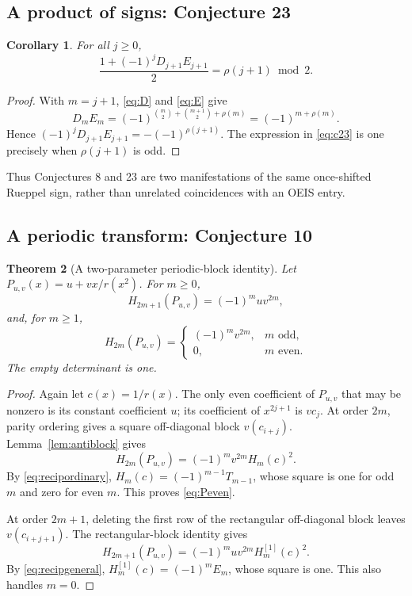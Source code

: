 \documentclass[11pt,a4paper]{article}
\numberwithin{equation}{section}
\newtheorem{theorem}{Theorem}[section]
\newtheorem{corollary}[theorem]{Corollary}
\theoremstyle{definition}
\theoremstyle{remark}
\newcommand{\Ones}{\rho}
\begin{document}
\subsection{A product of signs: Conjecture 23}

\begin{corollary}\label{cor:c23}
For all $j\ge0$,
\begin{equation}\label{eq:c23}
 \frac{1+(-1)^jD_{j+1}E_{j+1}}2
 =\Ones(j+1)\bmod2.
\end{equation}
\end{corollary}
\begin{proof}
With $m=j+1$, \eqref{eq:D} and \eqref{eq:E} give
\[
 D_mE_m=(-1)^{\binom m2+\binom{m+1}{2}+\Ones(m)}
       =(-1)^{m+\Ones(m)}.
\]
Hence $(-1)^jD_{j+1}E_{j+1}=-(-1)^{\Ones(j+1)}$. The expression in
\eqref{eq:c23} is one precisely when $\Ones(j+1)$ is odd.
\end{proof}

Thus Conjectures 8 and 23 are two manifestations of the same once-shifted
Rueppel sign, rather than unrelated coincidences with an OEIS entry.

\subsection{A periodic transform: Conjecture 10}

\begin{theorem}[A two-parameter periodic-block identity]\label{thm:period}
Let $P_{u,v}(x)=u+v x/r(x^2)$. For $m\ge0$,
\begin{equation}\label{eq:Podd}
 H_{2m+1}(P_{u,v})=(-1)^m u v^{2m},
\end{equation}
and, for $m\ge1$,
\begin{equation}\label{eq:Peven}
 H_{2m}(P_{u,v})=
 \begin{cases}
 (-1)^m v^{2m},&m\text{ odd},\\
 0,&m\text{ even}.
 \end{cases}
\end{equation}
The empty determinant is one.
\end{theorem}
\begin{proof}
Again let $c(x)=1/r(x)$. The only even coefficient of $P_{u,v}$ that
may be nonzero is its constant coefficient $u$; its coefficient of
$x^{2j+1}$ is $v c_j$. At order $2m$, parity ordering gives a square
off-diagonal block $v(c_{i+j})$. Lemma~\ref{lem:antiblock} gives
\[
 H_{2m}(P_{u,v})=(-1)^m v^{2m}H_m(c)^2.
\]
By \eqref{eq:recipordinary}, $H_m(c)=(-1)^{m-1}T_{m-1}$, whose square
is one for odd $m$ and zero for even $m$. This proves \eqref{eq:Peven}.

At order $2m+1$, deleting the first row of the rectangular off-diagonal
block leaves $v(c_{i+j+1})$. The rectangular-block identity gives
\[
 H_{2m+1}(P_{u,v})=(-1)^m u v^{2m}H_m^{[1]}(c)^2.
\]
By \eqref{eq:recipgeneral}, $H_m^{[1]}(c)=(-1)^mE_m$, whose square is
one. This also handles $m=0$.
\end{proof}
\end{document}
